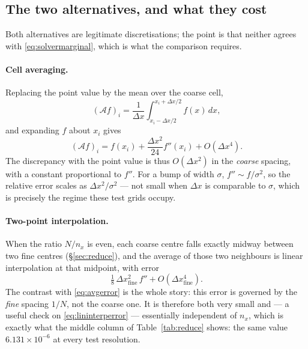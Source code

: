 \documentclass[11pt]{article}
\newcommand{\dx}{\Delta x}
\begin{document}
\subsection{The two alternatives, and what they cost}

Both alternatives are legitimate discretisations; the point is that neither
agrees with \eqref{eq:solvermarginal}, which is what the comparison requires.

\paragraph{Cell averaging.} Replacing the point value by the mean over the
coarse cell,
\begin{equation}
  (\mathcal{A}f)_i = \frac{1}{\dx}\int_{x_i-\dx/2}^{x_i+\dx/2} f(x)\,dx ,
\end{equation}
and expanding $f$ about $x_i$ gives
\begin{equation}
  (\mathcal{A}f)_i = f(x_i) + \frac{\dx^2}{24}f''(x_i) + O(\dx^4).
  \label{eq:avgerror}
\end{equation}
The discrepancy with the point value is thus $O(\dx^2)$ in the \emph{coarse}
spacing, with a constant proportional to $f''$. For a bump of width $\sigma$,
$f''\sim f/\sigma^2$, so the relative error scales as $\dx^2/\sigma^2$ --- not
small when $\dx$ is comparable to $\sigma$, which is precisely the regime these
test grids occupy.

\paragraph{Two-point interpolation.} When the ratio $N/n_x$ is even, each coarse
centre falls exactly midway between two fine centres (\S\ref{sec:reduce}), and
the average of those two neighbours is linear interpolation at that midpoint,
with error
\begin{equation}
  \tfrac18\,\dx_{\text{fine}}^2\,f''+O(\dx_{\text{fine}}^4).
  \label{eq:lininterperror}
\end{equation}
The contrast with \eqref{eq:avgerror} is the whole story: this error is governed
by the \emph{fine} spacing $1/N$, not the coarse one. It is therefore both very
small and --- a useful check on \eqref{eq:lininterperror} --- essentially
independent of $n_x$, which is exactly what the middle column of
Table~\ref{tab:reduce} shows: the same value $6.131\times10^{-6}$ at every test
resolution.
\end{document}
